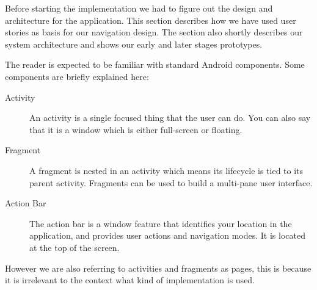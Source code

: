 Before starting the implementation we had to figure out the design and architecture for the application. This section describes how we have used user stories as basis for our navigation design. The section also shortly describes our system architecture and shows our early and later stages prototypes.

The reader is expected to be familiar with standard Android components. Some components are briefly explained here:
\begin{description}
\item[Activity] An activity is a single focused thing that the user can do. You can also say that it is a window which is either full-screen or floating. \citep{activity}
\item[Fragment] A fragment is nested in an activity which means its lifecycle is tied to its parent activity. Fragments can be used to build a multi-pane user interface. \citep{fragment}
\item[Action Bar] The action bar is a window feature that identifies your location in the application, and provides user actions and navigation modes. It is located at the top of the screen. \citep{actionbar}
\end{description}

However we are also referring to activities and fragments as pages, this is because it is irrelevant to the context what kind of implementation is used.